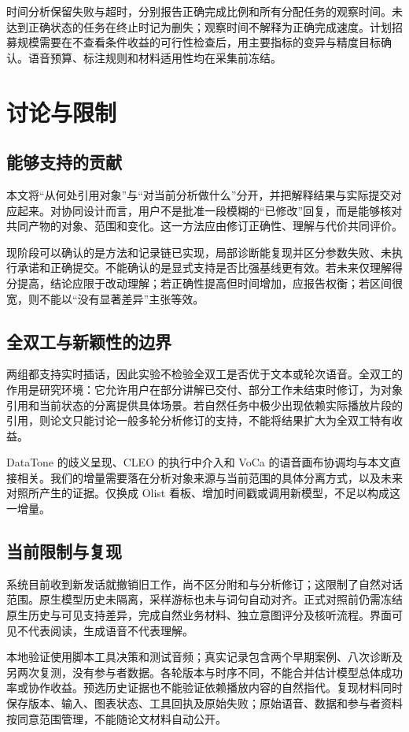 \documentclass[conference]{IEEEtran}
\begin{document}
时间分析保留失败与超时，分别报告正确完成比例和所有分配任务的观察时间。未达到正确状态的任务在终止时记为删失；观察时间不解释为正确完成速度。计划招募规模需要在不查看条件收益的可行性检查后，用主要指标的变异与精度目标确认。语音预算、标注规则和材料适用性均在采集前冻结。

\section{讨论与限制}
\subsection{能够支持的贡献}
本文将“从何处引用对象”与“对当前分析做什么”分开，并把解释结果与实际提交对应起来。对协同设计而言，用户不是批准一段模糊的“已修改”回复，而是能够核对共同产物的对象、范围和变化。这一方法应由修订正确性、理解与代价共同评价。

现阶段可以确认的是方法和记录链已实现，局部诊断能复现并区分参数失败、未执行承诺和正确提交。不能确认的是显式支持是否比强基线更有效。若未来仅理解得分提高，结论应限于改动理解；若正确性提高但时间增加，应报告权衡；若区间很宽，则不能以“没有显著差异”主张等效。

\subsection{全双工与新颖性的边界}
两组都支持实时插话，因此实验不检验全双工是否优于文本或轮次语音。全双工的作用是研究环境：它允许用户在部分讲解已交付、部分工作未结束时修订，为对象引用和当前状态的分离提供具体场景。若自然任务中极少出现依赖实际播放片段的引用，则论文只能讨论一般多轮分析修订的支持，不能将结果扩大为全双工特有收益。

DataTone 的歧义呈现、CLEO 的执行中介入和 VoCa 的语音画布协调均与本文直接相关。我们的增量需要落在分析对象来源与当前范围的具体分离方式，以及未来对照所产生的证据。仅换成 Olist 看板、增加时间戳或调用新模型，不足以构成这一增量。

\subsection{当前限制与复现}
系统目前收到新发话就撤销旧工作，尚不区分附和与分析修订；这限制了自然对话范围。原生模型历史未隔离，采样游标也未与词句自动对齐。正式对照前仍需冻结原生历史与可见支持差异，完成自然业务材料、独立意图评分及核听流程。界面可见不代表阅读，生成语音不代表理解。

本地验证使用脚本工具决策和测试音频；真实记录包含两个早期案例、八次诊断及另两次复测，没有参与者数据。各轮版本与时序不同，不能合并估计模型总体成功率或协作收益。预选历史证据也不能验证依赖播放内容的自然指代。复现材料同时保存版本、输入、图表状态、工具回执及原始失败；原始语音、数据和参与者资料按同意范围管理，不能随论文材料自动公开。
\end{document}
